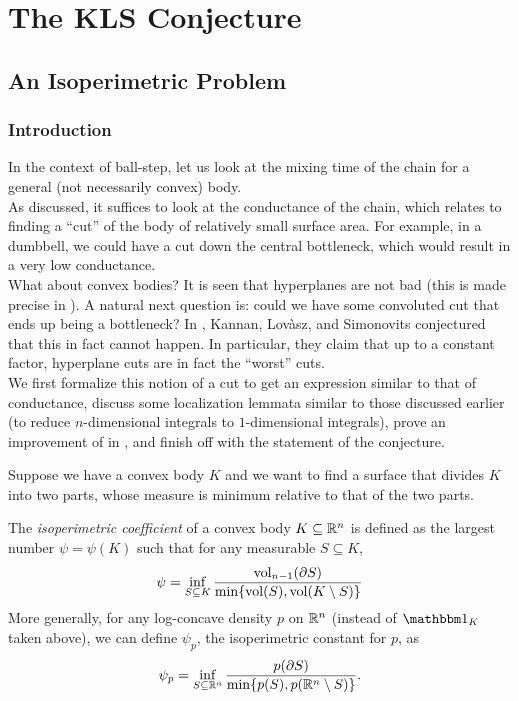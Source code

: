 \section{The KLS Conjecture}

\subsection{An Isoperimetric Problem}

\subsubsection{Introduction}

In the context of ball-step, let us look at the mixing time of the chain for a general (not necessarily convex) body.\\
As discussed, it suffices to look at the conductance of the chain, which relates to finding a ``cut'' of the body of relatively small surface area. For example, in a dumbbell, we could have a cut down the central bottleneck, which would result in a very low conductance.\\
What about convex bodies? It is seen that hyperplanes are not bad (this is made precise in ). A natural next question is: could we have some convoluted cut that ends up being a bottleneck? In \cite{KLSConjecture}, Kannan, Lov\`asz, and Simonovits conjectured that this in fact cannot happen. In particular, they claim that up to a constant factor, hyperplane cuts are in fact the ``worst'' cuts.\\
We first formalize this notion of a cut to get an expression similar to that of conductance, discuss some localization lemmata similar to those discussed earlier (to reduce $n$-dimensional integrals to $1$-dimensional integrals), prove an improvement of  in , and finish off with the statement of the conjecture.

Suppose we have a convex body $K$ and we want to find a surface that divides $K$ into two parts, whose measure is minimum relative to that of the two parts.

\begin{fdef}
	\label{def: isoperimetric coefficient}
	The \textit{isoperimetric coefficient} of a convex body $K\subseteq\mathbb{R}^n$ is defined as the largest number $\psi=\psi(K)$ such that for any measurable $S\subseteq K$,
	\[ \psi = \inf_{S\subseteq K} \frac{\operatorname{vol}_{n-1}(\partial S)}{\min\{\operatorname{vol}(S),\operatorname{vol}(K\setminus S)\}} \]
	More generally, for any log-concave density $p$ on $\mathbb{R}^n$ (instead of $\indic_K$ taken above), we can define $\psi_p$, the isoperimetric constant for $p$, as
	\[ \psi_p = \inf_{S\subseteq\mathbb{R}^n} \frac{p(\partial S)}{\min\{p(S),p(\mathbb{R}^n\setminus S)\}}. \]
\end{fdef}

